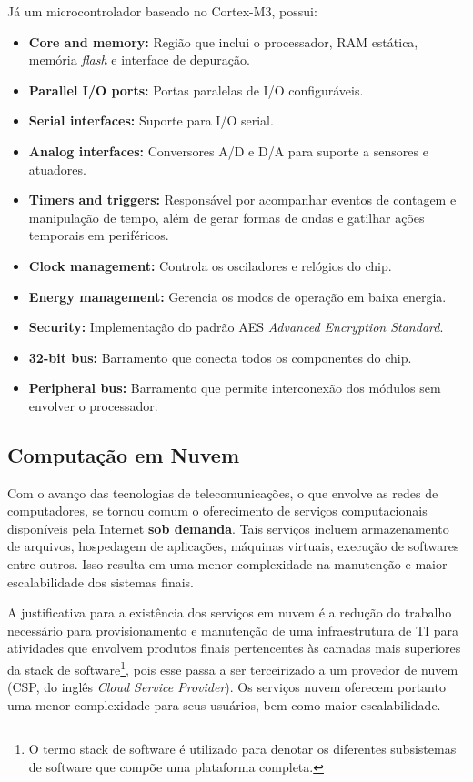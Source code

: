 \documentclass{article}
\begin{document}
Já um microcontrolador baseado no Cortex-M3, possui:

\begin{itemize}
    \item \textbf{Core and memory:} Região que inclui o processador, RAM
        estática, memória \textit{flash} e interface de depuração.
    \item \textbf{Parallel I/O ports:} Portas paralelas de I/O configuráveis.
    \item \textbf{Serial interfaces:} Suporte para I/O serial.
    \item \textbf{Analog interfaces:} Conversores A/D e D/A para suporte a
        sensores e atuadores.
    \item \textbf{Timers and triggers:} Responsável por acompanhar eventos de
        contagem e manipulação de tempo, além de gerar formas de ondas e
        gatilhar ações temporais em periféricos.
    \item \textbf{Clock management:} Controla os osciladores e relógios do chip.
    \item \textbf{Energy management:} Gerencia os modos de operação em baixa
        energia.
    \item \textbf{Security:} Implementação do padrão AES \textit{Advanced
        Encryption Standard}.
    \item \textbf{32-bit bus:} Barramento que conecta todos os componentes do
        chip.
    \item \textbf{Peripheral bus:} Barramento que permite interconexão dos
        módulos sem envolver o processador.
\end{itemize}

\subsection{Computação em Nuvem}
Com o avanço das tecnologias de telecomunicações, o que envolve as redes de
computadores, se tornou comum o oferecimento de serviços computacionais
disponíveis pela Internet \textbf{sob demanda}. Tais serviços incluem
armazenamento de arquivos, hospedagem de aplicações, máquinas virtuais, execução
de softwares entre outros. Isso resulta em uma menor complexidade na manutenção
e maior escalabilidade dos sistemas finais.

A justificativa para a existência dos serviços em nuvem é a redução do trabalho
necessário para provisionamento e manutenção de uma infraestrutura de TI para
atividades que envolvem produtos finais pertencentes às camadas mais superiores
da stack de software\footnote{O termo stack de software é utilizado para denotar
os diferentes subsistemas de software que compõe uma plataforma completa.}, pois
esse passa a ser terceirizado a um provedor de nuvem (CSP, do inglês
\textit{Cloud Service Provider}). Os serviços nuvem oferecem portanto uma menor
complexidade para seus usuários, bem como maior escalabilidade.
\end{document}
